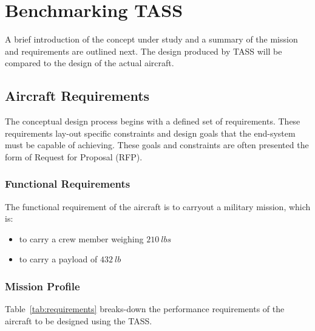 \documentclass[pdftex,11pt,letter]{article}
\begin{document}
\section{Benchmarking TASS}
A brief introduction of the concept under study and a summary of the mission and requirements are  outlined next\cite{MavrisNotes}. The design produced by TASS will be compared to the design of the actual aircraft.

\subsection{Aircraft Requirements}\label{requirements}
 The conceptual design process begins with a defined set of requirements. These requirements lay-out specific constraints and design goals that the end-system must be capable of achieving.  These goals and constraints are often presented the form of Request for Proposal (RFP). %

\subsubsection{Functional Requirements}
The functional requirement of the aircraft is to carryout a military mission, which is:
\begin{itemize}
\item to carry a crew member weighing  $210~lbs$ 
\item to carry a payload of $432~lb$
\end{itemize}

\subsubsection{Mission Profile}
Table~\ref{tab:requirements} breaks-down the performance requirements of the aircraft to be designed using the TASS. 
\end{document}
